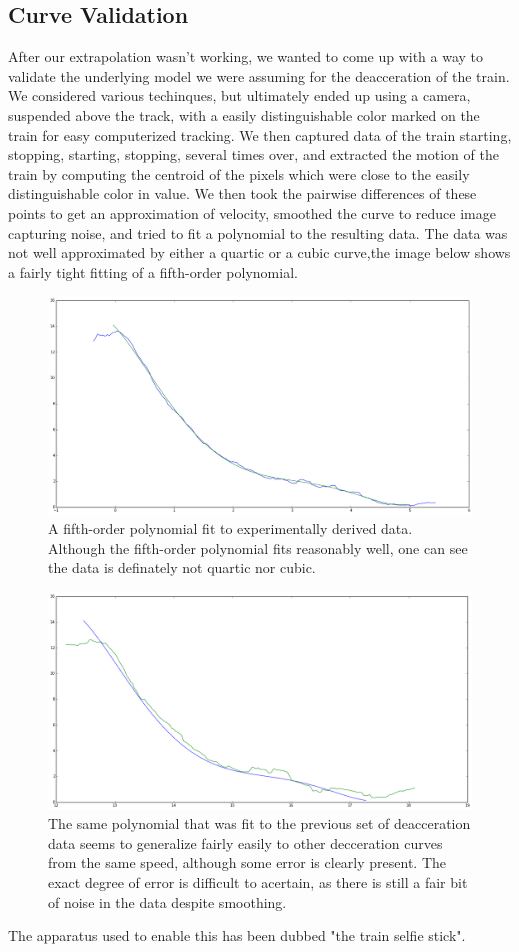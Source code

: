 \documentclass[titlepage]{article}
\begin{document}
\subsection{Curve Validation}
After our extrapolation wasn't working, we wanted to come up with a way to
validate the underlying model we were assuming for the deacceration of the
train. We considered various techinques, but ultimately ended up using a
camera, suspended above the track, with a easily distinguishable color marked
on the train for easy computerized tracking. We then captured data of the train
starting, stopping, starting, stopping, several times over, and extracted
the motion of the train by computing the centroid of the pixels which were
close to the easily distinguishable color in value. We then took the pairwise
differences of these points to get an approximation of velocity, smoothed the
curve to reduce image capturing noise, and tried to fit a polynomial to the
resulting data. The data was not well approximated by either a quartic or a
cubic curve,the image below shows a fairly tight fitting of a fifth-order
polynomial.
\begin{figure}[ht!]
\includegraphics[width=\linewidth]{deaccel.png}
\caption{A fifth-order polynomial fit to experimentally derived data. Although
the fifth-order polynomial fits reasonably well, one can see the data is
definately not quartic nor cubic.}
\end{figure}
\begin{figure}[ht!]
\includegraphics[width=\linewidth]{deaccel2.png}
\caption{The same polynomial that was fit to the previous set of deacceration
data seems to generalize fairly easily to other decceration curves from the
same speed, although some error is clearly present. The exact degree of error
is difficult to acertain, as there is still a fair bit of noise in the data
despite smoothing.}
\end{figure}
The apparatus used to enable this has been dubbed "the
train selfie stick".
\end{document}
